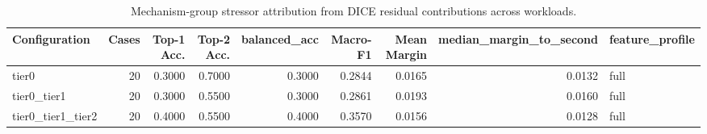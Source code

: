 \begin{table}[t]
\centering
\caption{Mechanism-group stressor attribution from DICE residual contributions across workloads.}
\label{tab:dice_stressor_diagnosis}
\footnotesize
\begin{tabular}{lrrrrrrrl}
\toprule
Configuration & Cases & Top-1 Acc. & Top-2 Acc. & balanced_acc & Macro-F1 & Mean Margin & median_margin_to_second & feature_profile \\
\midrule
tier0 & 20 & 0.3000 & 0.7000 & 0.3000 & 0.2844 & 0.0165 & 0.0132 & full \\
tier0_tier1 & 20 & 0.3000 & 0.5500 & 0.3000 & 0.2861 & 0.0193 & 0.0160 & full \\
tier0_tier1_tier2 & 20 & 0.4000 & 0.5500 & 0.4000 & 0.3570 & 0.0156 & 0.0128 & full \\
\bottomrule
\end{tabular}

\end{table}
